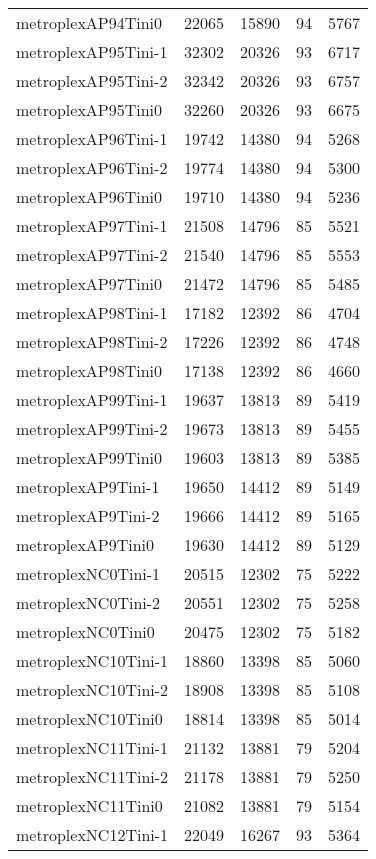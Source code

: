 \begin{longtable}{lrrrr}
metroplexAP94Tini0 & 22065 & 15890 & 94 & 5767 \\
metroplexAP95Tini-1 & 32302 & 20326 & 93 & 6717 \\
metroplexAP95Tini-2 & 32342 & 20326 & 93 & 6757 \\
metroplexAP95Tini0 & 32260 & 20326 & 93 & 6675 \\
metroplexAP96Tini-1 & 19742 & 14380 & 94 & 5268 \\
metroplexAP96Tini-2 & 19774 & 14380 & 94 & 5300 \\
metroplexAP96Tini0 & 19710 & 14380 & 94 & 5236 \\
metroplexAP97Tini-1 & 21508 & 14796 & 85 & 5521 \\
metroplexAP97Tini-2 & 21540 & 14796 & 85 & 5553 \\
metroplexAP97Tini0 & 21472 & 14796 & 85 & 5485 \\
metroplexAP98Tini-1 & 17182 & 12392 & 86 & 4704 \\
metroplexAP98Tini-2 & 17226 & 12392 & 86 & 4748 \\
metroplexAP98Tini0 & 17138 & 12392 & 86 & 4660 \\
metroplexAP99Tini-1 & 19637 & 13813 & 89 & 5419 \\
metroplexAP99Tini-2 & 19673 & 13813 & 89 & 5455 \\
metroplexAP99Tini0 & 19603 & 13813 & 89 & 5385 \\
metroplexAP9Tini-1 & 19650 & 14412 & 89 & 5149 \\
metroplexAP9Tini-2 & 19666 & 14412 & 89 & 5165 \\
metroplexAP9Tini0 & 19630 & 14412 & 89 & 5129 \\
metroplexNC0Tini-1 & 20515 & 12302 & 75 & 5222 \\
metroplexNC0Tini-2 & 20551 & 12302 & 75 & 5258 \\
metroplexNC0Tini0 & 20475 & 12302 & 75 & 5182 \\
metroplexNC10Tini-1 & 18860 & 13398 & 85 & 5060 \\
metroplexNC10Tini-2 & 18908 & 13398 & 85 & 5108 \\
metroplexNC10Tini0 & 18814 & 13398 & 85 & 5014 \\
metroplexNC11Tini-1 & 21132 & 13881 & 79 & 5204 \\
metroplexNC11Tini-2 & 21178 & 13881 & 79 & 5250 \\
metroplexNC11Tini0 & 21082 & 13881 & 79 & 5154 \\
metroplexNC12Tini-1 & 22049 & 16267 & 93 & 5364 \\

\end{longtable}
